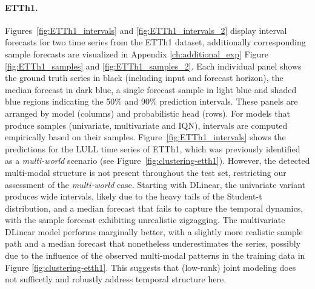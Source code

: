 \documentclass[a4paper,oneside,bibliography=totoc]{scrbook}
\begin{document}
\paragraph{ETTh1.}
Figures~\ref{fig:ETTh1_intervals} and \ref{fig:ETTh1_intervals_2} display interval forecasts for two time series from the ETTh1 dataset, additionally corresponding sample forecasts are visualized in Appendix \ref{ch:additional_exp} Figure \ref{fig:ETTh1_samples} and \ref{fig:ETTh1_samples_2}. Each individual panel shows the ground truth series in black (including input and forecast horizon), the median forecast in dark blue, a single forecast sample in light blue and shaded blue regions indicating the 50\% and 90\% prediction intervals. These panels are arranged by model (columns) and probabilistic head (rows). 
For models that produce samples (univariate, multivariate and IQN), intervals are computed empirically based on their samples. 
Figure~\ref{fig:ETTh1_intervals} shows the predictions for the LULL time series of ETTh1, which was previously identified as a \textit{multi-world} scenario (see Figure~\ref{fig:clustering-etth1}). 
However, the detected multi-modal structure is not present throughout the test set, restricting our assessment of the \textit{multi-world} case. 
Starting with DLinear, the univariate variant produces wide intervals, likely due to the heavy tails of the Student-t distribution, and a median forecast that fails to capture the temporal dynamics, with the sample forecast exhibiting unrealistic zigzagging.
The multivariate DLinear model performs marginally better, with a slightly more realistic sample path and a median forecast that nonetheless underestimates the series, possibly due to the influence of the observed multi-modal patterns in the training data in Figure \ref{fig:clustering-etth1}.
This suggests that (low-rank) joint modeling does not sufficetly and robustly address temporal structure here.
\end{document}
